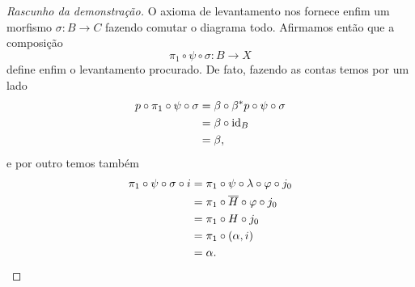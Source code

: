 \begin{proof}[Rascunho da demonstração]
  O axioma de levantamento nos fornece enfim um morfismo $\sigma: B \to C$ fazendo comutar o diagrama todo.
  Afirmamos então que a composição
  \begin{displaymath}
    \pi_{1} \circ \psi \circ \sigma: B \to X
  \end{displaymath}
  define enfim o levantamento procurado.
  De fato, fazendo as contas temos por um lado
  \begin{align*}
    p \circ \pi_{1} \circ \psi \circ \sigma
    & = \beta \circ \beta^{*}p \circ \psi \circ \sigma \\
    & = \beta \circ \mathrm{id}_{B} \\
    & = \beta,
  \end{align*}
  e por outro temos também
  \begin{align*}
    \pi_{1} \circ \psi \circ \sigma \circ i
    & = \pi_{1} \circ \psi \circ \lambda \circ \varphi \circ j_{0} \\
    & = \pi_{1} \circ \overline{H} \circ \varphi \circ j_{0} \\
    & = \pi_{1} \circ H \circ j_{0} \\
    & = \pi_{1} \circ (\alpha,i) \\
    & = \alpha. \qedhere
  \end{align*}
\end{proof}





